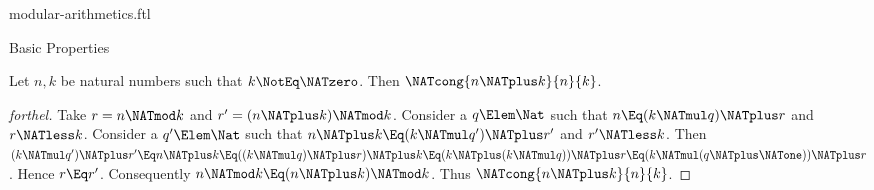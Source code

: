 \documentclass{stex}
\begin{document}
\begin{smodule}{modular-arithmetics.ftl}
\begin{sfragment}{Basic Properties}
  
  \begin{proposition}[forthel,name=congruency of sum]
    Let $n, k$ be natural numbers such that $k \NotEq \NATzero$.
    Then $\NATcong{n \NATplus k}{n}{k}$.
  \end{proposition}
  \begin{proof}[forthel]
    Take $r = n \NATmod k$ and $r' = (n \NATplus k) \NATmod k$.
    Consider a $q \Elem \Nat$ such that $n \Eq (k \NATmul q) \NATplus r$ and $r \NATless k$.
    Consider a $q' \Elem \Nat$ such that $n \NATplus k \Eq (k \NATmul q') \NATplus r'$ and
    $r' \NATless k$.
    Then $(k \NATmul q') \NATplus r'
      \Eq n \NATplus k
      \Eq ((k \NATmul q) \NATplus r) \NATplus k
      \Eq (k \NATplus (k \NATmul q)) \NATplus r
      \Eq (k \NATmul (q \NATplus \NATone)) \NATplus r$.
    Hence $r \Eq r'$.
    Consequently $n \NATmod k \Eq (n \NATplus k) \NATmod k$.
    Thus $\NATcong{n \NATplus k}{n}{k}$.
  \end{proof}
\end{sfragment}
\end{smodule}
\end{document}
